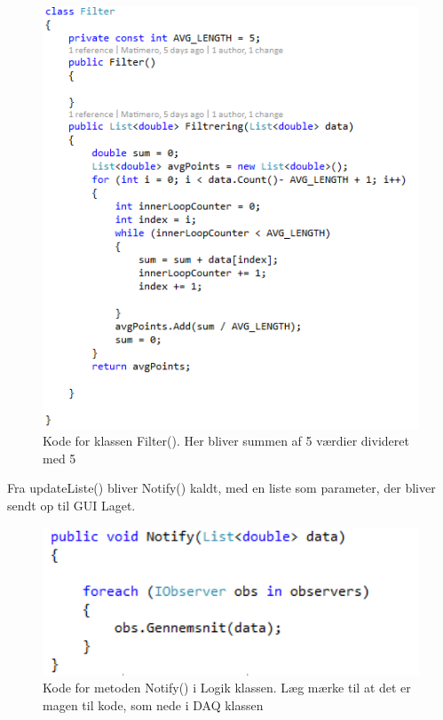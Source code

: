 \begin{figure}[H]
	\centering
	\includegraphics[width=1.0\textwidth]{FigurerProgram/Filter}
	\caption{Kode for klassen Filter(). Her bliver summen af 5 værdier divideret med 5}
\end{figure}

Fra updateListe() bliver Notify() kaldt, med en liste som parameter, der bliver sendt op til GUI Laget.

\begin{figure}[H]
	\centering
	\includegraphics[width=1.0\textwidth]{FigurerProgram/NotifyLogik}
	\caption{Kode for metoden Notify() i Logik klassen. Læg mærke til at det er magen til kode, som nede i DAQ klassen}
\end{figure}

